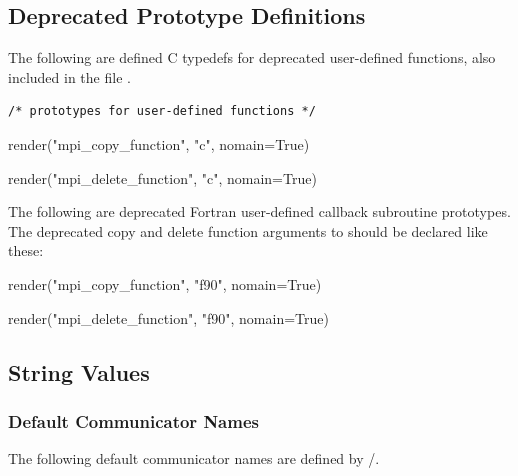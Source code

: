 
\subsection{Deprecated Prototype Definitions}

The following are defined C typedefs for deprecated user-defined functions, 
also included in the file .

\begin{verbatim}
/* prototypes for user-defined functions */
\end{verbatim}
\begin{mpi-binding}
    render("mpi_copy_function", "c", nomain=True)
\end{mpi-binding}
\begin{mpi-binding}
    render("mpi_delete_function", "c", nomain=True)
\end{mpi-binding}

The following are deprecated Fortran user-defined callback subroutine
prototypes.
%
The 
deprecated copy and delete function arguments
to  should be declared like these:

\begin{mpi-binding}
    render("mpi_copy_function", "f90", nomain=True)
\end{mpi-binding}

\begin{mpi-binding}
    render("mpi_delete_function", "f90", nomain=True)
\end{mpi-binding}

\subsection{String Values}

\subsubsection{Default Communicator Names}

The following default communicator names are defined by \MPI/. \\[3pt]
 \\
 \\
\\

